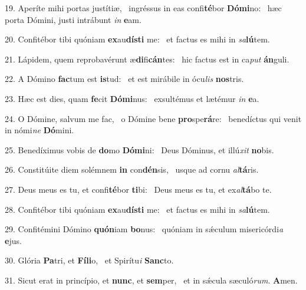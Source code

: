 19. Aperíte mihi portas justítiæ, \dag\  ingréssus in eas confi\textbf{té}bor \textbf{Dó}\textbf{mi}no: \ast\  hæc porta Dómini, justi intrábunt \textit{in} \textbf{e}am.\

20. Confitébor tibi quóniam \textbf{ex}au\textbf{dís}\textbf{ti} me: \ast\  et factus es mihi in \textit{sa}\textbf{lú}tem.\

21. Lápidem, quem reprobavérunt æ\textbf{di}fi\textbf{cán}tes: \ast\  hic factus est in ca\textit{put} \textbf{án}guli.\

22. A Dómino \textbf{fac}tum est \textbf{is}tud: \ast\  et est mirábile in ócu\textit{lis} \textbf{nos}tris.\

23. Hæc est dies, quam \textbf{fe}cit \textbf{Dó}\textbf{mi}nus: \ast\  exsultémus et lætémur \textit{in} \textbf{e}a.\

24. O Dómine, salvum me fac, \dag\  o Dómine bene \textbf{pro}spe\textbf{rá}re: \ast\  benedíctus qui venit in nómi\textit{ne} \textbf{Dó}mini.\

25. Benedíximus vobis de \textbf{do}mo \textbf{Dó}\textbf{mi}ni: \ast\  Deus Dóminus, et illú\textit{xit} \textbf{no}bis.\

26. Constitúite diem solémnem \textbf{in} con\textbf{dén}sis, \ast\  usque ad cornu \textit{al}\textbf{tá}ris.\

27. Deus meus es tu, et confi\textbf{té}bor \textbf{ti}bi: \ast\  Deus meus es tu, et ex\textit{al}\textbf{tá}bo te.\

28. Confitébor tibi quóniam \textbf{ex}au\textbf{dís}\textbf{ti} me: \ast\  et factus es mihi in \textit{sa}\textbf{lú}tem.\

29. Confitémini Dómino \textbf{quón}iam \textbf{bo}nus: \ast\  quóniam in sǽculum misericórdi\textit{a} \textbf{e}jus.\

30. Glória \textbf{Pa}tri, et \textbf{Fí}\textbf{li}o, \ast\  et Spirítu\textit{i} \textbf{Sanc}to.\

31. Sicut erat in princípio, et \textbf{nunc}, et \textbf{sem}per, \ast\  et in sǽcula sæculó\textit{rum}. \textbf{A}men.\


